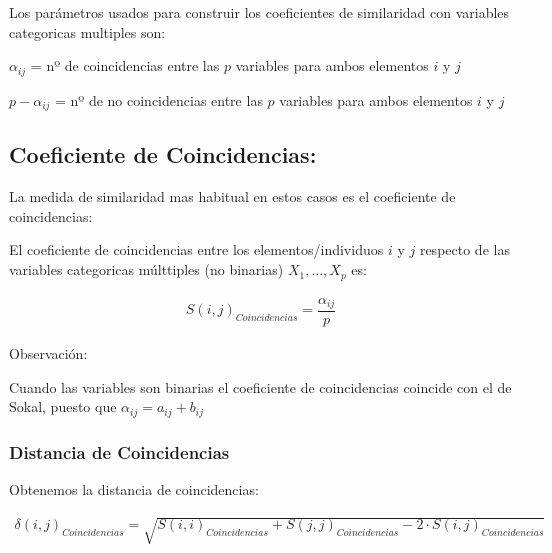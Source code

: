 \documentclass[12pt]{report} %
\begin{document}
\begin{tcolorbox}[toptitle=2mm,title=     ]
Los parámetros usados para construir los coeficientes de similaridad con variables categoricas multiples son:

$\alpha_{ij}$ = nº de coincidencias entre las $p$ variables para ambos elementos $i$ y $j$

$p-\alpha_{ij}$ = nº de no coincidencias entre las $p$ variables para ambos elementos $i$ y $j$
\end{tcolorbox}

\subsection{Coeficiente de Coincidencias:}

La medida de similaridad mas habitual en estos casos es el coeficiente de coincidencias:

\begin{tcolorbox}[toptitle=2mm,title=  Coeficiente de Coincidencias:   ]

El coeficiente de coincidencias entre los elementos/individuos $i$ y $j$ respecto de las variables categoricas múlttiples (no binarias) $X_1,...,X_p$ es:

\begin{gather*}
S(i,j)_{Coincidencias}= \dfrac{\alpha_{ij}}{p}
\end{gather*}

\end{tcolorbox}


Observación:

Cuando las variables son binarias el coeficiente de coincidencias coincide con el de Sokal, puesto que $\alpha_{ij}=a_{ij}+b_{ij}$


\subsubsection{Distancia de Coincidencias}

\begin{tcolorbox}[toptitle=2mm,title=  Distancia de Coincidencias:   ]

Obtenemos la distancia de coincidencias:

\begin{gather*}
\delta(i,j)_{Coincidencias} = \sqrt{S(i,i)_{Coincidencias} +S(j,j)_{Coincidencias} - 2\cdot S(i,j)_{Coincidencias} }
\end{gather*}

\end{tcolorbox}
\end{document}
